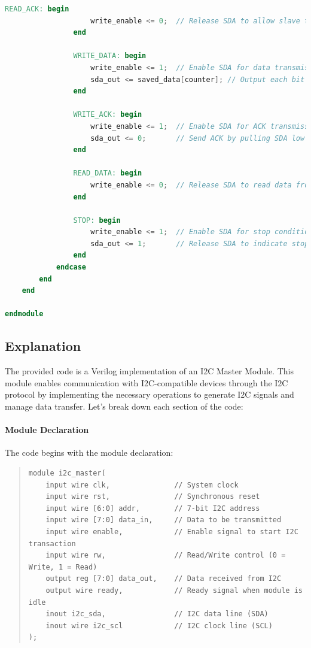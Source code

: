 \documentclass[a4paper,12pt]{report}
\begin{document}
\begin{lstlisting}[language=Verilog, caption={I2C Master Module in Verilog}, label=lst:i2c_master]
                READ_ACK: begin
                    write_enable <= 0;  // Release SDA to allow slave to drive ACK/NACK
                end
                
                WRITE_DATA: begin 
                    write_enable <= 1;  // Enable SDA for data transmission
                    sda_out <= saved_data[counter]; // Output each bit of data to SDA
                end
                
                WRITE_ACK: begin
                    write_enable <= 1;  // Enable SDA for ACK transmission
                    sda_out <= 0;       // Send ACK by pulling SDA low
                end
                
                READ_DATA: begin
                    write_enable <= 0;  // Release SDA to read data from slave
                end
                
                STOP: begin
                    write_enable <= 1;  // Enable SDA for stop condition
                    sda_out <= 1;       // Release SDA to indicate stop
                end
            endcase
        end
    end

endmodule
\end{lstlisting}
\newpage
\subsection{Explanation}

The provided code is a Verilog implementation of an I2C Master Module. This module enables communication with I2C-compatible devices through the I2C protocol by implementing the necessary operations to generate I2C signals and manage data transfer. Let’s break down each section of the code:

\paragraph{Module Declaration}
The code begins with the module declaration:

\begin{quote}
\begin{verbatim}
module i2c_master(
    input wire clk,               // System clock
    input wire rst,               // Synchronous reset
    input wire [6:0] addr,        // 7-bit I2C address
    input wire [7:0] data_in,     // Data to be transmitted
    input wire enable,            // Enable signal to start I2C transaction
    input wire rw,                // Read/Write control (0 = Write, 1 = Read)
    output reg [7:0] data_out,    // Data received from I2C
    output wire ready,            // Ready signal when module is idle
    inout i2c_sda,                // I2C data line (SDA)
    inout wire i2c_scl            // I2C clock line (SCL)
);
\end{verbatim}
\end{quote}
\end{document}
